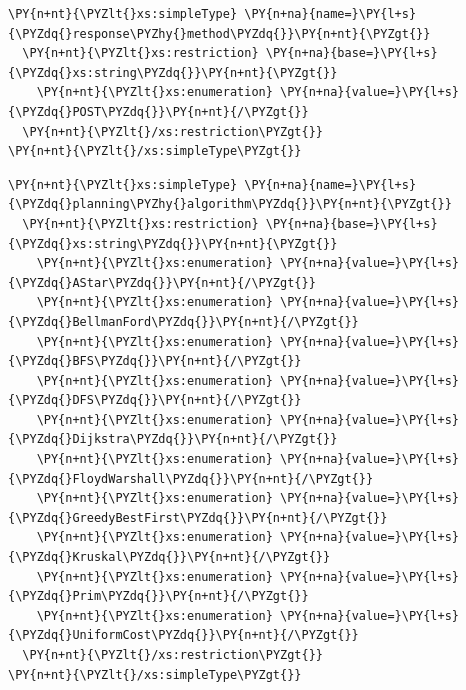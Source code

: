 \begin{program}
\begin{code}
\begin{Verbatim}[commandchars=\\\{\}]
\PY{n+nt}{\PYZlt{}xs:simpleType} \PY{n+na}{name=}\PY{l+s}{\PYZdq{}response\PYZhy{}method\PYZdq{}}\PY{n+nt}{\PYZgt{}}
  \PY{n+nt}{\PYZlt{}xs:restriction} \PY{n+na}{base=}\PY{l+s}{\PYZdq{}xs:string\PYZdq{}}\PY{n+nt}{\PYZgt{}}
    \PY{n+nt}{\PYZlt{}xs:enumeration} \PY{n+na}{value=}\PY{l+s}{\PYZdq{}POST\PYZdq{}}\PY{n+nt}{/\PYZgt{}}
  \PY{n+nt}{\PYZlt{}/xs:restriction\PYZgt{}}
\PY{n+nt}{\PYZlt{}/xs:simpleType\PYZgt{}}
\end{Verbatim}
\end{code}
\end{program}

\begin{program}
\begin{code}
\begin{Verbatim}[commandchars=\\\{\}]
\PY{n+nt}{\PYZlt{}xs:simpleType} \PY{n+na}{name=}\PY{l+s}{\PYZdq{}planning\PYZhy{}algorithm\PYZdq{}}\PY{n+nt}{\PYZgt{}}
  \PY{n+nt}{\PYZlt{}xs:restriction} \PY{n+na}{base=}\PY{l+s}{\PYZdq{}xs:string\PYZdq{}}\PY{n+nt}{\PYZgt{}}
    \PY{n+nt}{\PYZlt{}xs:enumeration} \PY{n+na}{value=}\PY{l+s}{\PYZdq{}AStar\PYZdq{}}\PY{n+nt}{/\PYZgt{}}
    \PY{n+nt}{\PYZlt{}xs:enumeration} \PY{n+na}{value=}\PY{l+s}{\PYZdq{}BellmanFord\PYZdq{}}\PY{n+nt}{/\PYZgt{}}
    \PY{n+nt}{\PYZlt{}xs:enumeration} \PY{n+na}{value=}\PY{l+s}{\PYZdq{}BFS\PYZdq{}}\PY{n+nt}{/\PYZgt{}}
    \PY{n+nt}{\PYZlt{}xs:enumeration} \PY{n+na}{value=}\PY{l+s}{\PYZdq{}DFS\PYZdq{}}\PY{n+nt}{/\PYZgt{}}
    \PY{n+nt}{\PYZlt{}xs:enumeration} \PY{n+na}{value=}\PY{l+s}{\PYZdq{}Dijkstra\PYZdq{}}\PY{n+nt}{/\PYZgt{}}
    \PY{n+nt}{\PYZlt{}xs:enumeration} \PY{n+na}{value=}\PY{l+s}{\PYZdq{}FloydWarshall\PYZdq{}}\PY{n+nt}{/\PYZgt{}}
    \PY{n+nt}{\PYZlt{}xs:enumeration} \PY{n+na}{value=}\PY{l+s}{\PYZdq{}GreedyBestFirst\PYZdq{}}\PY{n+nt}{/\PYZgt{}}
    \PY{n+nt}{\PYZlt{}xs:enumeration} \PY{n+na}{value=}\PY{l+s}{\PYZdq{}Kruskal\PYZdq{}}\PY{n+nt}{/\PYZgt{}}
    \PY{n+nt}{\PYZlt{}xs:enumeration} \PY{n+na}{value=}\PY{l+s}{\PYZdq{}Prim\PYZdq{}}\PY{n+nt}{/\PYZgt{}}
    \PY{n+nt}{\PYZlt{}xs:enumeration} \PY{n+na}{value=}\PY{l+s}{\PYZdq{}UniformCost\PYZdq{}}\PY{n+nt}{/\PYZgt{}}
  \PY{n+nt}{\PYZlt{}/xs:restriction\PYZgt{}}
\PY{n+nt}{\PYZlt{}/xs:simpleType\PYZgt{}}
\end{Verbatim}
\end{code}
\end{program}


